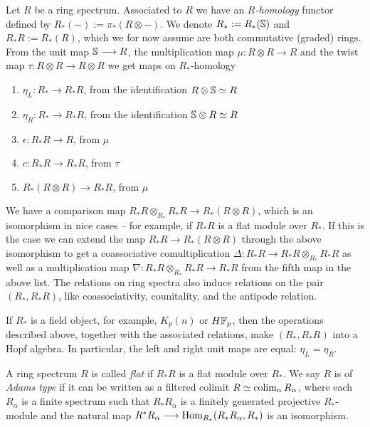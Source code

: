 \begin{construction}
    Let $R$ be a ring spectrum. Associated to $R$ we have an \emph{$R$-homology} functor defined by $R_*(-):= \pi_*(R\otimes -)$. We denote $R_*:=R_*(\S)$ and $R_*R:= R_*(R)$, which we for now assume are both commutative (graded) rings. From the unit map $\S\longrightarrow R$, the multiplication map $\mu\colon R\otimes R\longrightarrow R$ and the twist map $\tau\colon R\otimes R\longrightarrow R\otimes R$ we get maps on $R_*$-homology
    \begin{enumerate}
        \item $\eta_L\colon R_*\longrightarrow R_*R$, from the identification $R\otimes \S\simeq R$
        \item $\eta_R\colon R_*\longrightarrow R_*R$, from the identification $\S\otimes R\simeq R$
        \item $\epsilon\colon R_*R\longrightarrow R$, from $\mu$
        \item $c\colon R_*R\longrightarrow R_*R$, from $\tau$
        \item $R_*(R\otimes R)\longrightarrow R_*R$, from $\mu$
    \end{enumerate}
    We have a comparison map $R_*R\otimes_{R_*}R_*R\longrightarrow R_*(R\otimes R)$, which is an isomorphism in nice cases -- for example, if $R_*R$ is a flat module over $R_*$. If this is the case we can extend the map $R_*R\longrightarrow R_*(R\otimes R)$ through the above isomorphism to get a coassociative comultiplication $\Delta\colon R_*R\longrightarrow R_*R\otimes_{R_*}R_*R$ as well as a multiplication map $\nabla\colon R_*R\otimes_{R_*}R_*R\longrightarrow R_*R$ from the fifth map in the above list. The relations on ring spectra also induce relations on the pair $(R_*, R_*R)$, like coassociativity, counitality, and the antipode relation.   
\end{construction}

\begin{remark}
    If $R_*$ is a field object, for example, $K_p(n)$ or $H\F_p$, then the operations described above, together with the associated relations, make $(R_*, R_*R)$ into a Hopf algebra. In particular, the left and right unit maps are equal: $\eta_L=\eta_R$. 
\end{remark}

\begin{definition}
    A ring spectrum $R$ is called \emph{flat} if $R_*R$ is a flat module over $R_*$. We say $R$ is of \emph{Adams type} if it can be written as a filtered colimit $R\simeq \colim_\alpha R_\alpha$, where each $R_\alpha$ is a finite spectrum such that $R_*R_\alpha$ is a finitely generated projective $R_*$-module and the natural map $R^*R_\alpha \longrightarrow \Hom_{R_*}(R_*R_\alpha, R_*)$ is an isomorphism.
\end{definition}

